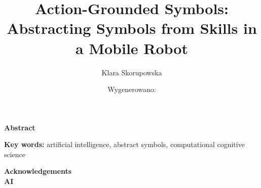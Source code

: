 \documentclass{article}
\title{Action-Grounded Symbols: Abstracting Symbols from Skills in a Mobile Robot}
\author{Klara Skorupowska}
\date{Wygenerowano: \DTMnow}
\begin{document}
\newcommand{\todo}[1]{%
  \colorbox{green}{[TODO: #1]}\\%
}
\newcommand{\checkthis}[1]{
        \colorbox{yellow}{(Q: #1?)}
}

\maketitle
\newpage
\begin{center}
    \textbf{Abstract}
\end{center}

\vspace{0.5cm}

\textbf{Key words:} artificial intelligence, abstract symbols, computational cognitive science

\newpage
\tableofcontents


\newpage

\newpage

\newpage

\newpage

\newpage

\newpage


\newpage
\textbf{Acknowledgements}\\

\textbf{AI}\\


\appendix
\newpage



\newpage
\printbibliography
\end{document}
